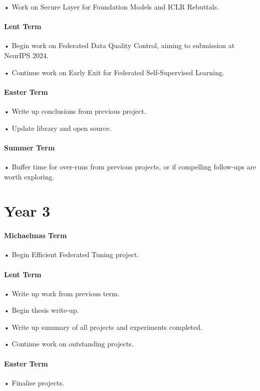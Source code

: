 \documentclass[withindex,glossary,firstyr]{cam-thesis}
\begin{document}
• Work on Secure Layer for Foundation Models and ICLR Rebuttals. 

\paragraph{Lent Term} 

• Begin work on Federated Data Quality Control, aiming to submission at NeurIPS 2024. 

• Continue work on Early Exit for Federated Self-Supervised Learning. 


\paragraph{Easter Term}

• Write up conclusions from previous project.

• Update library and open source.

\paragraph{Summer Term}

• Buffer time for over-runs from previous projects, or if compelling follow-ups are worth exploring.

\section{Year 3}

\paragraph{Michaelmas Term}

• Begin Efficient Federated Tuning project. 

\paragraph{Lent Term}

• Write up work from previous term.

• Begin thesis write-up.

• Write up summary of all projects and experiments completed.

• Continue work on outstanding projects.

\paragraph{Easter Term}
• Finalise projects. 
\end{document}
